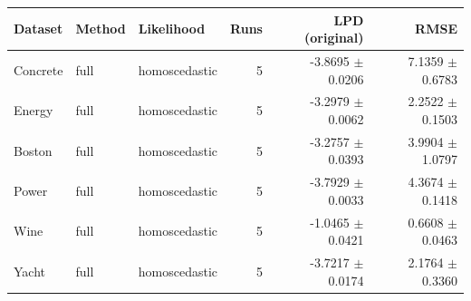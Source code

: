 \begin{tabular}{lllrrr}
\toprule
Dataset & Method & Likelihood & Runs & LPD (original) & RMSE \\
\midrule
Concrete & full & homoscedastic & 5 & -3.8695 $\pm$ 0.0206 & 7.1359 $\pm$ 0.6783 \\
Energy & full & homoscedastic & 5 & -3.2979 $\pm$ 0.0062 & 2.2522 $\pm$ 0.1503 \\
Boston & full & homoscedastic & 5 & -3.2757 $\pm$ 0.0393 & 3.9904 $\pm$ 1.0797 \\
Power & full & homoscedastic & 5 & -3.7929 $\pm$ 0.0033 & 4.3674 $\pm$ 0.1418 \\
Wine & full & homoscedastic & 5 & -1.0465 $\pm$ 0.0421 & 0.6608 $\pm$ 0.0463 \\
Yacht & full & homoscedastic & 5 & -3.7217 $\pm$ 0.0174 & 2.1764 $\pm$ 0.3360 \\
\bottomrule
\end{tabular}

